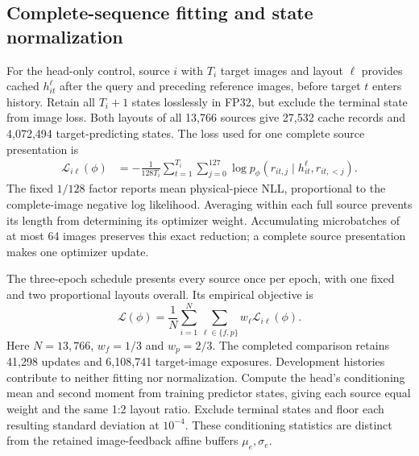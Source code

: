 \subsection*{Complete-sequence fitting and state normalization}
For the head-only control, source $i$ with $T_i$ target images and layout $\ell$
provides cached
$h_{it}^{\ell}$ after the query and preceding reference images, before target
$t$ enters history. Retain all $T_i+1$ states losslessly in FP32, but exclude
the terminal state from image loss. Both layouts of all 13,766 sources give
27,532 cache records and 4,072,494 target-predicting states. The loss used for
one complete source presentation is
\begin{equation}
 \begin{aligned}
 \mathcal L_{i\ell}(\phi)
   &=-\frac{1}{128T_i}\sum_{t=1}^{T_i}\sum_{j=0}^{127}
       \log p_\phi(r_{it,j}\mid h_{it}^{\ell},r_{it,<j}).
 \end{aligned}
 \label{eq:joint-glyph-sequence-loss}
\end{equation}
The fixed $1/128$ factor reports mean physical-piece NLL, proportional to the
complete-image negative log likelihood. Averaging within each full source
prevents its length from determining its optimizer weight. Accumulating
microbatches of at most 64 images preserves this exact reduction; a complete
source presentation makes one optimizer update.

The three-epoch schedule presents every source once per epoch, with one fixed
and two proportional layouts overall. Its empirical objective is
\begin{equation}
 \mathcal L(\phi)=\frac1N\sum_{i=1}^{N}\sum_{\ell\in\{f,p\}}
       w_\ell\mathcal L_{i\ell}(\phi).
 \label{eq:joint-glyph-layout-loss}
\end{equation}
Here $N=13{,}766$, $w_f=1/3$ and $w_p=2/3$.
The completed comparison retains 41,298 updates and 6,108,741 target-image
exposures. Development histories contribute to neither fitting nor
normalization. Compute the head's conditioning mean and second moment from
training predictor states, giving each source equal weight and the same 1:2
layout ratio. Exclude terminal states and floor each resulting standard
deviation at $10^{-4}$. These conditioning statistics are distinct from
the retained image-feedback affine buffers $\mu_e,\sigma_e$.

